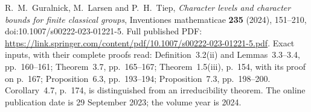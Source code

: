 R.~M.~Guralnick, M.~Larsen and P.~H.~Tiep,
\emph{Character levels and character bounds for finite classical groups},
Inventiones mathematicae \textbf{235} (2024), 151--210,
doi:10.1007/s00222-023-01221-5.
Full published PDF:
\url{https://link.springer.com/content/pdf/10.1007/s00222-023-01221-5.pdf}.
Exact inputs, with their complete proofs read:
Definition~3.2(ii) and Lemmas~3.3--3.4, pp.~160--161;
Theorem~3.7, pp.~165--167;
Theorem~1.5(iii), p.~154, with its proof on p.~167;
Proposition~6.3, pp.~193--194;
Proposition~7.3, pp.~198--200.
Corollary~4.7, p.~174, is distinguished from an irreducibility theorem.
The online publication date is 29 September 2023; the volume year is 2024.

